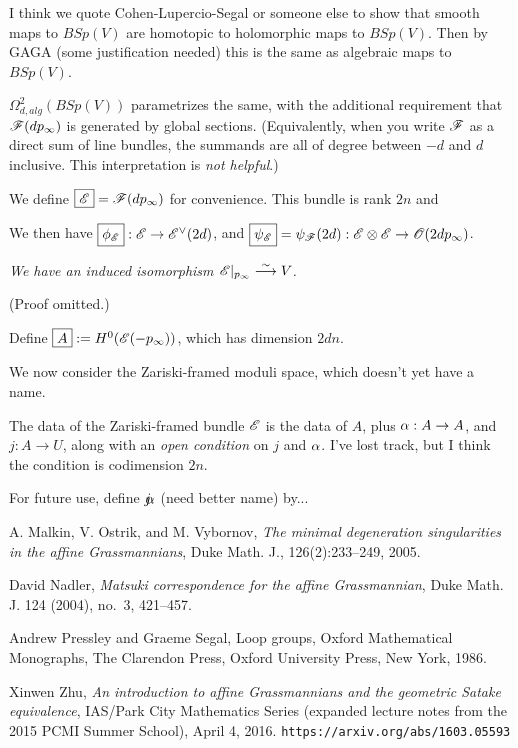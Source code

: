 {
I think we quote Cohen-Lupercio-Segal or someone else to show that smooth maps to $BSp(V)$ are homotopic to holomorphic maps to $BSp(V)$.
Then by GAGA (some justification needed) this is the same as algebraic maps to $BSp(V)$.

\point $\boxed{\Omega^2_{d,alg}(B Sp(V))}$ parametrizes the same, with the additional requirement that ${\mathscr{F}}(d p_\infty)$ is
generated by global sections.  (Equivalently, when you write ${\mathscr{F}}$ as a direct sum of line bundles, the summands
are all of degree between $-d$ and $d$ inclusive.  This interpretation is {\em not helpful}.)

We define $\boxed{{\mathscr{E}}} = {\mathscr{F}} (d p_{\infty})$ for convenience.  This bundle is rank $2n$ and 

We then have $\boxed{\phi_{{\mathscr{E}}}} : {\mathscr{E}} \rightarrow {\mathscr{E}}^\vee(2d)$, and $\boxed{\psi_{{\mathscr{E}}}} = \psi_{{\mathscr{F}}}(2d) : {\mathscr{E}} \otimes {\mathscr{E}} \rightarrow {\mathscr{O}}(2d p_{\infty})$.

{\em We have an induced isomorphism ${\mathscr{E}}|_{p_{\infty}} \overset \sim \longrightarrow V$.}

(Proof omitted.)


Define $\boxed{A}  := H^0({\mathscr{E}}(-p_\infty))$, which has dimension $2dn$.  

We now consider the Zariski-framed moduli space, which doesn't yet have a name.

The data of the Zariski-framed bundle ${\mathscr{E}}$ is the data of $A$, plus $\alpha: A \rightarrow A$, and $j:A \rightarrow U$,
along with an {\em open condition} on $j$ and $\alpha$.  I've lost track, but I think the condition is codimension $2n$.


For future use, define $\mathord{j\mkern-7mu\alpha}$ (need better name) by...


}  %


\begin{thebibliography}{[HPLqjm]}


 A. Malkin, V. Ostrik, and M. Vybornov, {\em  The minimal degeneration singularities in the affine Grassmannians}, Duke Math. J., 126(2):233–249,
2005.

 David Nadler, {\em Matsuki correspondence for the affine Grassmannian}, Duke Math. J. 124 (2004), no.\ 3,
421–457.

Andrew Pressley and Graeme Segal, Loop groups, Oxford Mathematical Monographs, The Clarendon Press, Oxford University Press, New York, 1986. 

 Xinwen Zhu, {\em An introduction to affine Grassmannians and the geometric Satake equivalence}, IAS/Park City Mathematics Series (expanded lecture notes from the 2015 PCMI Summer School), April 4, 2016.  \verb+https://arxiv.org/abs/1603.05593+
\end{thebibliography}


